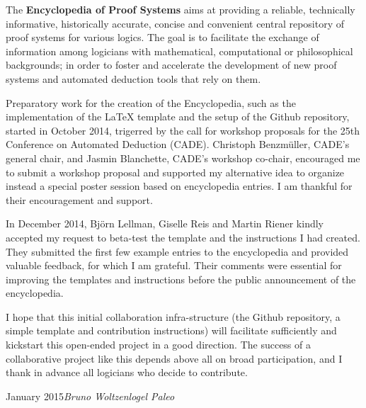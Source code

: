 
\preface

The \textbf{Encyclopedia of Proof Systems} aims at providing a reliable, technically informative, historically accurate, concise and convenient central repository of proof systems for various logics. The goal is to facilitate the exchange of information among logicians with mathematical, computational or philosophical backgrounds; in order to foster and accelerate the development of new proof systems and automated deduction tools that rely on them.

Preparatory work for the creation of the Encyclopedia, such as the implementation of the LaTeX template and the setup of the Github repository, started in October 2014, trigerred by the call for workshop proposals for the 25th Conference on Automated Deduction (CADE). Christoph Benzm\"uller, CADE's general chair, and Jasmin Blanchette, CADE's workshop co-chair, encouraged me to submit a workshop proposal and supported my alternative idea to organize instead a special poster session based on encyclopedia entries. I am thankful for their encouragement and support.

In December 2014, Bj\"orn Lellman, Giselle Reis and Martin Riener kindly accepted my request to beta-test the template and the instructions I had created. They submitted the first few example entries to the encyclopedia and provided valuable feedback, for which I am grateful. Their comments were essential for improving the templates and instructions before the public announcement of the encyclopedia.

I hope that this initial collaboration infra-structure (the Github repository, a simple template and contribution instructions) will facilitate sufficiently and kickstart this open-ended project in a good direction. The success of a collaborative project like this depends above all on broad participation, and I thank in advance all logicians who decide to contribute.
 

\vspace{\baselineskip}
\begin{flushright}\noindent
January 2015\hfill {\it Bruno Woltzenlogel Paleo}
\end{flushright}



